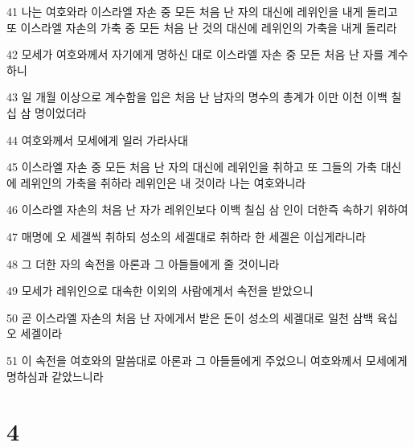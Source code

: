 \par 41 나는 여호와라 이스라엘 자손 중 모든 처음 난 자의 대신에 레위인을 내게 돌리고 또 이스라엘 자손의 가축 중 모든 처음 난 것의 대신에 레위인의 가축을 내게 돌리라
\par 42 모세가 여호와께서 자기에게 명하신 대로 이스라엘 자손 중 모든 처음 난 자를 계수하니
\par 43 일 개월 이상으로 계수함을 입은 처음 난 남자의 명수의 총계가 이만 이천 이백 칠십 삼 명이었더라
\par 44 여호와께서 모세에게 일러 가라사대
\par 45 이스라엘 자손 중 모든 처음 난 자의 대신에 레위인을 취하고 또 그들의 가축 대신에 레위인의 가축을 취하라 레위인은 내 것이라 나는 여호와니라
\par 46 이스라엘 자손의 처음 난 자가 레위인보다 이백 칠십 삼 인이 더한즉 속하기 위하여
\par 47 매명에 오 세겔씩 취하되 성소의 세겔대로 취하라 한 세겔은 이십게라니라
\par 48 그 더한 자의 속전을 아론과 그 아들들에게 줄 것이니라
\par 49 모세가 레위인으로 대속한 이외의 사람에게서 속전을 받았으니
\par 50 곧 이스라엘 자손의 처음 난 자에게서 받은 돈이 성소의 세겔대로 일천 삼백 육십 오 세겔이라
\par 51 이 속전을 여호와의 말씀대로 아론과 그 아들들에게 주었으니 여호와께서 모세에게 명하심과 같았느니라

\chapter{4}

